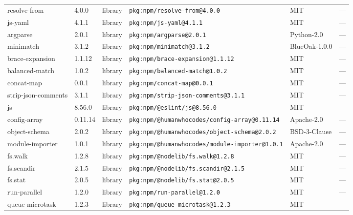 \documentclass[11pt,a4paper]{article}
\begin{document}
\begin{longtable}{|p{4cm}|p{2cm}|p{1.6cm}|p{5cm}|p{1.5cm}|p{3.5cm}|}
\raggedright resolve-from & 4.0.0 & library & \small\texttt{pkg:npm/resolve-from@4.0.0} & MIT & \small — \\
\raggedright js-yaml & 4.1.1 & library & \small\texttt{pkg:npm/js-yaml@4.1.1} & MIT & \small — \\
\raggedright argparse & 2.0.1 & library & \small\texttt{pkg:npm/argparse@2.0.1} & Python-2.0 & \small — \\
\raggedright minimatch & 3.1.2 & library & \small\texttt{pkg:npm/minimatch@3.1.2} & BlueOak-1.0.0 & \small — \\
\raggedright brace-expansion & 1.1.12 & library & \small\texttt{pkg:npm/brace-expansion@1.1.12} & MIT & \small — \\
\raggedright balanced-match & 1.0.2 & library & \small\texttt{pkg:npm/balanced-match@1.0.2} & MIT & \small — \\
\raggedright concat-map & 0.0.1 & library & \small\texttt{pkg:npm/concat-map@0.0.1} & MIT & \small — \\
\raggedright strip-json-comments & 3.1.1 & library & \small\texttt{pkg:npm/strip-json-comments@3.1.1} & MIT & \small — \\
\raggedright js & 8.56.0 & library & \small\texttt{pkg:npm/@eslint/js@8.56.0} & MIT & \small — \\
\raggedright config-array & 0.11.14 & library & \small\texttt{pkg:npm/@humanwhocodes/config-array@0.11.14} & Apache-2.0 & \small — \\
\raggedright object-schema & 2.0.2 & library & \small\texttt{pkg:npm/@humanwhocodes/object-schema@2.0.2} & BSD-3-Clause & \small — \\
\raggedright module-importer & 1.0.1 & library & \small\texttt{pkg:npm/@humanwhocodes/module-importer@1.0.1} & Apache-2.0 & \small — \\
\raggedright fs.walk & 1.2.8 & library & \small\texttt{pkg:npm/@nodelib/fs.walk@1.2.8} & MIT & \small — \\
\raggedright fs.scandir & 2.1.5 & library & \small\texttt{pkg:npm/@nodelib/fs.scandir@2.1.5} & MIT & \small — \\
\raggedright fs.stat & 2.0.5 & library & \small\texttt{pkg:npm/@nodelib/fs.stat@2.0.5} & MIT & \small — \\
\raggedright run-parallel & 1.2.0 & library & \small\texttt{pkg:npm/run-parallel@1.2.0} & MIT & \small — \\
\raggedright queue-microtask & 1.2.3 & library & \small\texttt{pkg:npm/queue-microtask@1.2.3} & MIT & \small — \\

\end{longtable}
\end{document}
